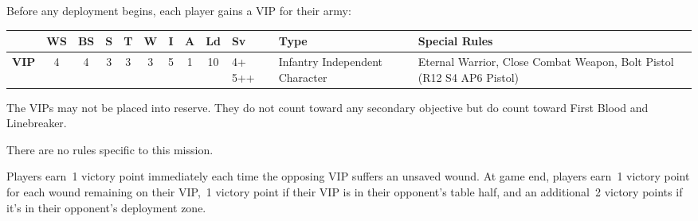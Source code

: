 

\begin{tablesetup}

  \vanguardstrike

  \smallskip%
  Before any deployment begins, each player gains a VIP
  for their army:

  \begin{center}    
  \begin{tabular}[t]{rccccccccF{.25in}F{1in}E{2in}}
    & {\bf WS} &  {\bf BS} & {\bf S} & {\bf T} & {\bf W} & {\bf I} & {\bf A} & {\bf Ld} & {\bf Sv} & {\bf Type} & {\bf Special Rules}\\
\hline
    {\bf VIP} & 4 & 4 & 3 & 3 & 3 & 5 & 1 & 10 & 4+ 5++ & Infantry Independent Character & Eternal Warrior, Close Combat Weapon, Bolt Pistol (R12 S4 AP6 Pistol)\\
  \end{tabular}
  \end{center}


  The VIPs may not be placed into reserve.  They do not count toward
  any secondary objective but do count toward First Blood and
  Linebreaker.
\end{tablesetup}

\begin{missionrules}

\bigskip
There are no rules specific to this mission.

\end{missionrules}


\begin{scoring}
\begin{primaries}

  Players earn~1 victory point immediately each time the opposing VIP
  suffers an unsaved wound.  At game end, players earn~1 victory point
  for each wound remaining on their VIP,~1 victory point if their VIP
  is in their opponent's table half, and an additional~2 victory
  points if it's in their opponent's deployment zone.


\end{primaries}
\end{scoring}
